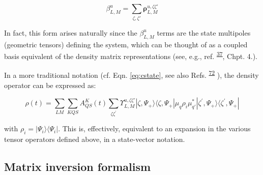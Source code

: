 \documentclass[10pt]{article}
\begin{document}
\begin{equation}
\beta_{L,M}^{u}=\sum_{\zeta,\zeta'}\mathbf{\rho}_{L,M}^{u,\zeta\zeta'}
\end{equation}

In fact, this form arises naturally since the $\beta_{L,M}^{u}$ terms are the state multipoles (geometric tensors) defining the system, which can be thought of as a coupled basis equivalent of the density matrix representations (see, e.g., ref. \textsuperscript{\hyperref[csl:37]{37}}, Chpt. 4.).

In a more traditional notation (cf. Eqn. \ref{eq:cstate}, see also Refs. \textsuperscript{\hyperref[csl:72]{72}} 
), the density operator can be expressed as:



\begin{equation}
\rho(t) =\sum_{LM}\sum_{KQS}A^{K}_{QS}(t)\sum_{\zeta\zeta^{\prime}}\varUpsilon_{L,M}^{u,\zeta\zeta'}|\zeta,\Psi_+\rangle\langle\zeta,\Psi_+|\mu_q\rho_i\mu_{q\prime}^{*}|\zeta^{\prime},\Psi_+\rangle\langle\zeta^{\prime},\Psi_+|
\end{equation}


with $\rho_i = |\Psi_i\rangle\langle\Psi_i|$. This is, effectively, equivalent to an expansion in the various tensor operators defined above, in a state-vector notation.




\subsection{Matrix inversion formalism\label{app:mat-inversion}}
\end{document}
